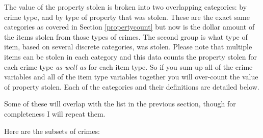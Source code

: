 \documentclass[
]{krantz}
\begin{document}
The value of the property stolen is broken into two
overlapping categories: by crime type, and by type of
property that was stolen. These are the exact same
categories as covered in Section \ref{propertycount} but now
is the dollar amount of the items stolen from those types of
crimes. The second group is what type of item, based on
several discrete categories, was stolen. Please note that
multiple items can be stolen in each category and this data
counts the property stolen for each crime type \emph{as well
as} for each item type. So if you sum up all of the crime
variables and all of the item type variables together you
will over-count the value of property stolen. Each of the
categories and their definitions are detailed below.

Some of these will overlap with the list in the previous
section, though for completeness I will repeat them.

Here are the subsets of crimes:
\end{document}
